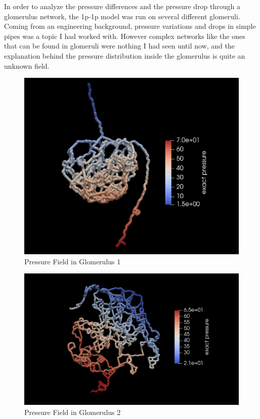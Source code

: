 In order to analyze the pressure differences and the pressure drop through a glomerulus network, the 1p-1p model was run on several different glomeruli. Coming from an engineering background, pressure variations and drops in simple pipes was a topic I had worked with. However complex networks like the ones that can be found in glomeruli were nothing I had seen until now, and the explanation behind the pressure distribution inside the glomerulus is quite an unknown field.\\
\begin{figure}[h]
\centering
\includegraphics[width=162mm]{glom_pressure}
\caption{Pressure Field in Glomerulus 1}
\label{fig:glom_pressure}
\end{figure}
\begin{figure}[h]
\centering
\includegraphics[width=162mm]{glom2_pressure}
\caption{Pressure Field in Glomerulus 2}
\label{fig:glom2_pressure}
\end{figure}
